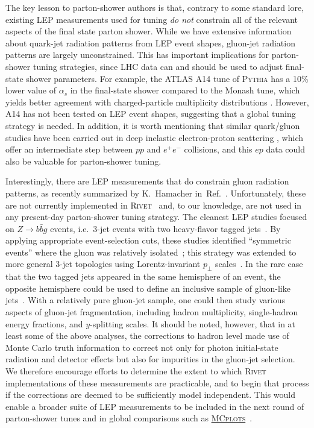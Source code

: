\documentclass[11pt,letterpaper]{article}
\DeclareRobustCommand{\Ref}[1]{Ref.~\cite{#1}}
\begin{document}
The key lesson to parton-shower authors is that, contrary to some standard lore, existing LEP measurements used for tuning \emph{do not} constrain all of the relevant aspects of the final state parton shower.  While we have extensive information about quark-jet radiation patterns from LEP event shapes, gluon-jet radiation patterns are largely unconstrained.  This has important implications for parton-shower tuning strategies, since LHC data can and should be used to adjust final-state shower parameters.  For example, the ATLAS A14 tune of \textsc{Pythia} has a 10\% lower value of $\alpha_s$ in the final-state shower compared to the Monash tune, which yields better agreement with charged-particle multiplicity distributions \cite{Aad:2016oit}.  However, A14 has not been tested on LEP event shapes, suggesting that a global tuning strategy is needed.   In addition, it is worth mentioning that similar quark/gluon studies have been carried out in deep inelastic electron-proton scattering \cite{Chekanov:2004kz}, which offer an intermediate step between $pp$ and $e^+ e^-$ collisions, and this $ep$ data could also be valuable for parton-shower tuning.

Interestingly, there are LEP measurements that do constrain gluon
radiation patterns, as recently summarized by K.~Hamacher in~\Ref{Anderle:2017qwx}.
%
Unfortunately, these are not currently implemented in \textsc{Rivet}~\cite{Buckley:2010ar} and, 
to our knowledge, are not used in any present-day parton-shower
tuning strategy.
%
The cleanest LEP studies focused on $Z\to b\bar{b}g$
events, i.e.\ 3-jet events with two heavy-flavor tagged
jets~\cite{Alexander:1991ce,Acton:1993jm}.
%
By applying appropriate event-selection cuts, these studies identified ``symmetric
events'' where the gluon was relatively isolated~\cite{Buskulic:1995sw,Abreu:1995hp,OPAL:1995ab,Abreu:1998ve};
this strategy was extended to more general 3-jet topologies using Lorentz-invariant $p_\perp$ scales~\cite{Abreu:1999af}.
%
In the rare case that the two tagged jets appeared in the same hemisphere of an event, the opposite hemisphere could be used to define an inclusive
sample of gluon-like jets~\cite{Alexander:1996qr,Ackerstaff:1997xg,Abbiendi:1999pi,Abbiendi:2003ri}.
%
With a relatively pure gluon-jet sample, one could then study various aspects of gluon-jet fragmentation, including hadron multiplicity, single-hadron energy fractions, and $y$-splitting scales.
%
It should be noted, however, that in at least some of the above analyses, the corrections to hadron level made use of Monte Carlo truth information
to correct not only for photon initial-state radiation and detector effects but also for impurities in the gluon-jet selection.
%
We therefore encourage efforts to determine the extent to which \textsc{Rivet} implementations of these measurements are practicable, and to begin that
process if the corrections are deemed to be sufficiently model independent.
%
This would enable a broader suite of LEP measurements to be included in the next round of parton-shower tunes and in global comparisons
such as
\href{http://mcplots.cern.ch}{\mbox{\textsc{MCplots}}}~\cite{Karneyeu:2013aha}.
\end{document}
